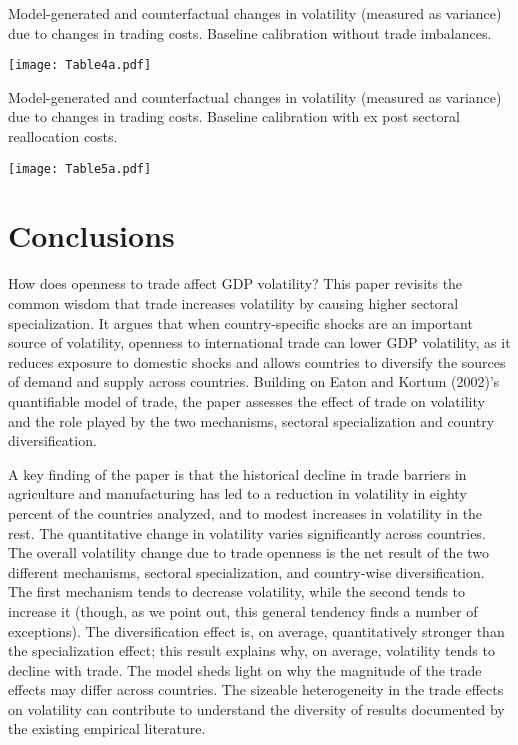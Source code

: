 \documentclass[12pt]{article}
\begin{document}
\begin{table}[h]
\caption{Model-generated and counterfactual changes in volatility (measured
as variance) due to changes in trading costs. Baseline calibration without
trade imbalances.}\centering\texttt{[image: Table4a.pdf]}
\end{table}

\begin{table}[h]
\caption{Model-generated and counterfactual changes in volatility (measured
as variance) due to changes in trading costs. Baseline calibration with ex
post sectoral reallocation costs.}\centering\texttt{[image: Table5a.pdf]}
\end{table}

\section{Conclusions}

How does openness to trade affect GDP volatility? This paper revisits the
common wisdom that trade increases volatility by causing higher sectoral
specialization. It argues that when country-specific shocks are an important
source of volatility, openness to international trade can lower GDP
volatility, as it reduces exposure to domestic shocks and allows countries
to diversify the sources of demand and supply across countries. Building on
Eaton and Kortum (2002)'s quantifiable model of trade, the paper assesses
the effect of trade on volatility and the role played by the two mechanisms,
sectoral specialization and country diversification.

A key finding of the paper is that the historical decline in trade barriers
in agriculture and manufacturing has led to a reduction in volatility in
eighty percent of the countries analyzed, and to modest increases in
volatility in the rest. The quantitative change in volatility varies
significantly across countries. The overall volatility change due to trade
openness is the net result of the two different mechanisms, sectoral
specialization, and country-wise diversification. The first mechanism tends
to decrease volatility, while the second tends to increase it (though, as we
point out, this general tendency finds a number of exceptions). The
diversification effect is, on average, quantitatively stronger than the
specialization effect; this result explains why, on average, volatility
tends to decline with trade. The model sheds light on why the magnitude of
the trade effects may differ across countries. The sizeable heterogeneity in
the trade effects on volatility can contribute to understand the diversity
of results documented by the existing empirical literature.
\end{document}

